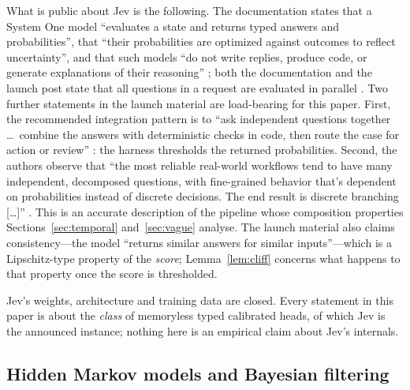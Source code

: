 \documentclass[11pt,a4paper]{article}
\numberwithin{equation}{section}
\theoremstyle{plain}
\theoremstyle{definition}
\theoremstyle{remark}
\begin{document}
What is public about Jev is the following. The documentation states that a System One model ``evaluates a state and returns typed answers and probabilities'', that ``their probabilities are optimized against outcomes to reflect uncertainty'', and that such models ``do not write replies, produce code, or generate explanations of their reasoning'' \citep{typesafe2026docs}; both the documentation and the launch post state that all questions in a request are evaluated in parallel \citep{typesafe2026docs,almeida2026jev}. Two further statements in the launch material are load-bearing for this paper. First, the recommended integration pattern is to ``ask independent questions together \ldots\ combine the answers with deterministic checks in code, then route the case for action or review'' \citep{typesafe2026docs}: the harness thresholds the returned probabilities. Second, the authors observe that ``the most reliable real-world workflows tend to have many independent, decomposed questions, with fine-grained behavior that's dependent on probabilities instead of discrete decisions. The end result is discrete branching\,[\ldots]'' \citep{almeida2026jev}. This is an accurate description of the pipeline whose composition properties Sections~\ref{sec:temporal} and~\ref{sec:vague} analyse. The launch material also claims consistency---the model ``returns similar answers for similar inputs''---which is a Lipschitz-type property of the \emph{score}; Lemma~\ref{lem:cliff} concerns what happens to that property once the score is thresholded.

Jev's weights, architecture and training data are closed. Every statement in this paper is about the \emph{class} of memoryless typed calibrated heads, of which Jev is the announced instance; nothing here is an empirical claim about Jev's internals.

\subsection{Hidden Markov models and Bayesian filtering}
\end{document}
